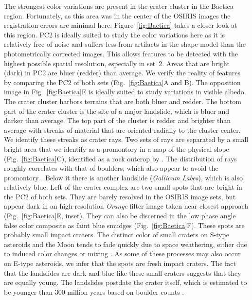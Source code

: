 \documentclass[3p,authoryear]{elsarticle}
\begin{document}
The strongest color variations are present in the crater cluster in the Baetica region. Fortunately, as this area was in the center of the OSIRIS images the registration errors are minimal here. Figure~\ref{fig:Baetica} takes a closer look at this region. PC2 is ideally suited to study the color variations here as it is relatively free of noise and suffers less from artifacts in the shape model than the photometrically corrected images. This allows features to be detected with the highest possible spatial resolution, especially in set~2. Areas that are bright (dark) in PC2 are bluer (redder) than average. We verify the reality of features by comparing the PC2 of both sets (Fig.~\ref{fig:Baetica}A and B). The opposition image in Fig.~\ref{fig:Baetica}E is ideally suited to study variations in visible albedo. The crater cluster harbors terrains that are both bluer and redder. The bottom part of the crater cluster is the site of a major landslide, which is bluer and darker than average. The top part of the cluster is redder and brighter than average with streaks of material that are oriented radially to the cluster center. We identify these streaks as crater rays. Two sets of rays are separated by a small bright area that we identify as a promontory in a map of the physical slope (Fig.~\ref{fig:Baetica}C), identified as a rock outcrop by \citet{M12}. The distribution of rays roughly correlates with that of boulders, which also appear to avoid the promontory \citep{K12}. Below it there is another landslide ({\it Gallicum Labes}), which is also relatively blue. Left of the crater complex are two small spots that are bright in the PC2 of both sets. They are barely resolved in the OSIRIS image sets, but appear dark in an high-resolution {\it Orange} filter image taken near closest approach (Fig.~\ref{fig:Baetica}E, inset). They can also be discerned in the low phase angle false color composite as faint blue smudges (Fig.~\ref{fig:Baetica}F). These spots are probably small impact craters. The distinct color of small craters on S-type asteroids and the Moon tends to fade quickly due to space weathering, either due to induced color changes \citep{H94,S96} or mixing \citep{Pi12}. As some of these processes may also occur on E-type asteroids, we infer that the spots are fresh impact craters. The fact that the landslides are dark and blue like these small craters suggests that they are equally young. The landslides postdate the crater itself, which is estimated to be younger than 300 million years based on boulder counts \citep{K12}.
\end{document}
